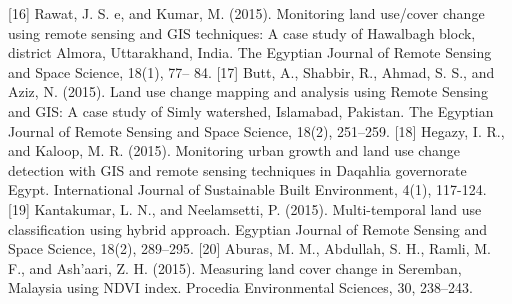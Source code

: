 \documentclass[12pt,a4paper]{article}
\begin{document}
	[16] Rawat, J. S. e, and Kumar, M. (2015). Monitoring land use/cover	change using remote sensing and GIS techniques: A case study of	Hawalbagh block, district Almora, Uttarakhand, India. The	Egyptian Journal of Remote Sensing and Space Science, 18(1), 77–
	84.
	[17] Butt, A., Shabbir, R., Ahmad, S. S., and Aziz, N. (2015). Land use	change mapping and analysis using Remote Sensing and GIS: A	case study of Simly watershed, Islamabad, Pakistan. The Egyptian	Journal of Remote Sensing and Space Science, 18(2), 251–259.
	[18] Hegazy, I. R., and Kaloop, M. R. (2015). Monitoring urban growth	and land use change detection with GIS and remote sensing	techniques in Daqahlia governorate Egypt. International Journal of	Sustainable Built Environment, 4(1), 117-124.
	[19] Kantakumar, L. N., and Neelamsetti, P. (2015). Multi-temporal land	use classification using hybrid approach. Egyptian Journal of	Remote Sensing and Space Science, 18(2), 289–295.
	[20] Aburas, M. M., Abdullah, S. H., Ramli, M. F., and Ash’aari, Z. H.	(2015). Measuring land cover change in Seremban, Malaysia using	NDVI index. Procedia Environmental Sciences, 30, 238–243.
	
\end{document}
